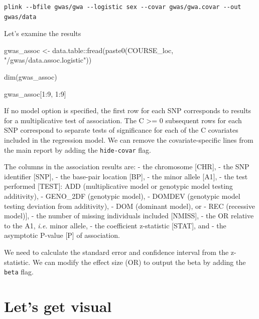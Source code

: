 \documentclass[
]{book}
\newenvironment{Shaded}{\begin{snugshade}}{\end{snugshade}}
\newcommand{\DecValTok}[1]{\textcolor[rgb]{0.00,0.00,0.81}{#1}}
\newcommand{\FunctionTok}[1]{\textcolor[rgb]{0.00,0.00,0.00}{#1}}
\newcommand{\NormalTok}[1]{#1}
\newcommand{\OtherTok}[1]{\textcolor[rgb]{0.56,0.35,0.01}{#1}}
\newcommand{\SpecialCharTok}[1]{\textcolor[rgb]{0.00,0.00,0.00}{#1}}
\newcommand{\StringTok}[1]{\textcolor[rgb]{0.31,0.60,0.02}{#1}}
\begin{document}
\begin{verbatim}
plink --bfile gwas/gwa --logistic sex --covar gwas/gwa.covar --out gwas/data
\end{verbatim}

Let's examine the results

\begin{Shaded}
\begin{Highlighting}[]
\NormalTok{gwas\_assoc }\OtherTok{\textless{}{-}}\NormalTok{ data.table}\SpecialCharTok{::}\FunctionTok{fread}\NormalTok{(}\FunctionTok{paste0}\NormalTok{(COURSE\_loc, }\StringTok{"/gwas/data.assoc.logistic"}\NormalTok{))}

\FunctionTok{dim}\NormalTok{(gwas\_assoc)}

\NormalTok{gwas\_assoc[}\DecValTok{1}\SpecialCharTok{:}\DecValTok{9}\NormalTok{, }\DecValTok{1}\SpecialCharTok{:}\DecValTok{9}\NormalTok{]}
\end{Highlighting}
\end{Shaded}

If no model option is specified, the first row for each SNP corresponds to results for a multiplicative test of association. The C \textgreater= 0 subsequent rows for each SNP correspond to separate tests of significance for each of the C covariates included in the regression model. We can remove the covariate-specific lines from the main report by adding the \texttt{hide-covar} flag.

The columns in the association results are:
- the chromosome {[}CHR{]},
- the SNP identifier {[}SNP{]},
- the base-pair location {[}BP{]},
- the minor allele {[}A1{]},
- the test performed {[}TEST{]}: ADD (multiplicative model or genotypic model testing additivity),
- GENO\_2DF (genotypic model),
- DOMDEV (genotypic model testing deviation from additivity),
- DOM (dominant model), or
- REC (recessive model){]},
- the number of missing individuals included {[}NMISS{]},
- the OR relative to the A1, \emph{i.e.} minor allele,
- the coefficient z-statistic {[}STAT{]}, and
- the asymptotic P-value {[}P{]} of association.

We need to calculate the standard error and confidence interval from the z-statistic. We can modify the effect size (OR) to output the beta by adding the \texttt{beta} flag.

\hypertarget{lets-get-visual}{%
\section{Let's get visual}\label{lets-get-visual}}
\end{document}

